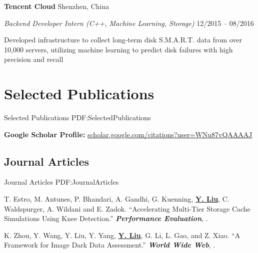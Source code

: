 \documentclass[a4paper,10pt,oneside]{article}
\begin{document}
\begin{body}
\GapNoBreak
{\textbf{Tencent Cloud}} 
\hfill
Shenzhen, China

\emph{Backend Developer Intern (C++, Machine Learning, Storage)}
\hfill
12/2015 --
08/2016

\GapNoBreak
\BulletItem
Developed infrastructure to collect long-term disk S.M.A.R.T. data from over 10,000 servers, utilizing machine learning to predict disk failures with high precision and recall 



\section
{Selected Publications}
{Selected Publications}
{PDF:SelectedPublications}


\textbf{Google Scholar Profile:} \href{https://scholar.google.com/citations?user=WNu87vQAAAAJ}{scholar.google.com/citations?user=WNu87vQAAAAJ}

\subsection
{Journal Articles}
{Journal Articles}
{PDF:JournalArticles}

\NumberedItem{[1]}
T. Estro, M. Antunes, P. Bhandari, A. Gandhi, G. Kuenning, \textbf{\underline{Y. Liu}}, C. Waldspurger, A. Wildani and E. Zadok.
``Accelerating Multi-Tier Storage Cache Simulations Using Knee Detection.'' 
\textit{\textbf{Performance Evaluation}},
.


\NumberedItem{[2]}
K. Zhou, Y. Wang, Y. Liu, Y. Yang, \textbf{\underline{Y. Liu}}, G. Li, L. Gao, and Z. Xiao.
``A Framework for Image Dark Data Assessment.'' 
\textit{\textbf{World Wide Web}},
.



\end{body}
\end{document}
